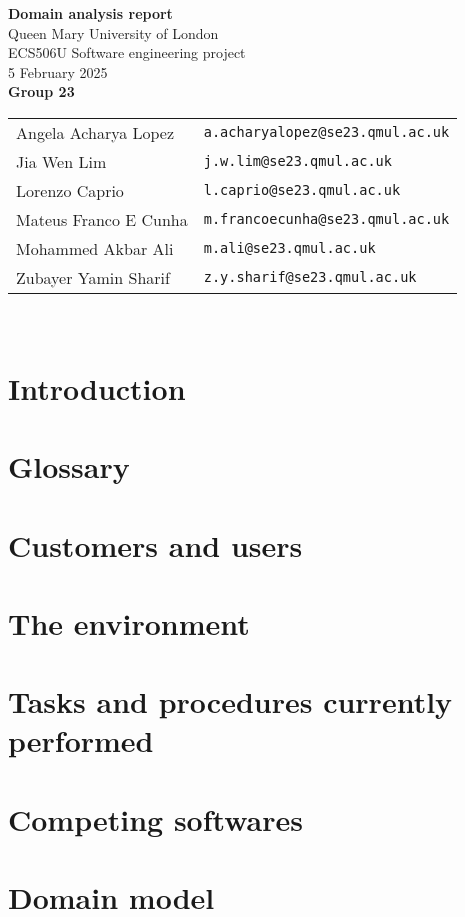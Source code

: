 \documentclass[a4paper, 10pt]{article}
\begin{document}
\begin{titlepage}
    \centering
    \vspace*{5em}
    {\Large\textbf{Domain analysis report}}
    \\\vspace*{1em}
    Queen Mary University of London \\
    ECS506U Software engineering project
    \\\vspace*{0.5em}
    5 February 2025
    \\\vspace*{1em}
    \textbf{Group 23}
    \\\vspace{0.25em}
    \begin{tabular}{ll}
        Angela Acharya Lopez & \texttt{a.acharyalopez@se23.qmul.ac.uk} \\
        Jia Wen Lim & \texttt{j.w.lim@se23.qmul.ac.uk} \\
        Lorenzo Caprio & \texttt{l.caprio@se23.qmul.ac.uk} \\
        Mateus Franco E Cunha & \texttt{m.francoecunha@se23.qmul.ac.uk} \\
        Mohammed Akbar Ali & \texttt{m.ali@se23.qmul.ac.uk} \\
        Zubayer Yamin Sharif & \texttt{z.y.sharif@se23.qmul.ac.uk} \\
    \end{tabular} \\
    \tableofcontents
\end{titlepage}

\section{Introduction}
\section{Glossary}
\section{Customers and users}
\section{The environment}
\section{Tasks and procedures currently performed}
\section{Competing softwares}
\section{Domain model}
\end{document}
